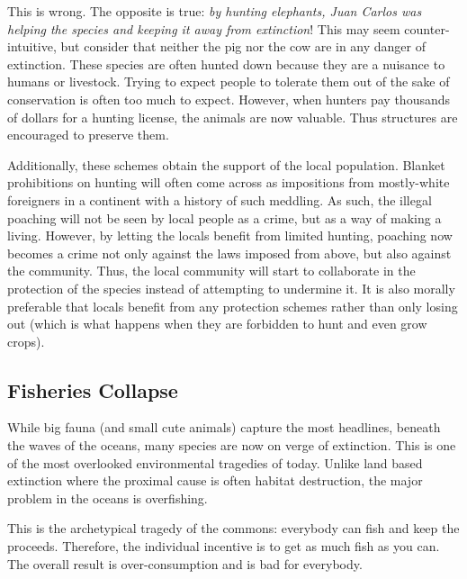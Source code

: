 This is wrong. The opposite is true: \emph{by hunting elephants, Juan Carlos
was helping the species and keeping it away from extinction}! This may seem
counter-intuitive, but consider that neither the pig nor the cow are in any
danger of extinction. These species are often hunted down because they are a
nuisance to humans or livestock. Trying to expect people to tolerate them out
of the sake of conservation is often too much to expect. However, when hunters
pay thousands of dollars for a hunting license, the animals are now valuable.
Thus structures are encouraged to preserve them.

Additionally, these schemes obtain the support of the local population. Blanket
prohibitions on hunting will often come across as impositions from mostly-white
foreigners in a continent with a history of such meddling. As such, the illegal
poaching will not be seen by local people as a crime, but as a way of making a
living. However, by letting the locals benefit from limited hunting, poaching
now becomes a crime not only against the laws imposed from above, but also
against the community. Thus, the local community will start to collaborate in
the protection of the species instead of attempting to undermine it. It is also
morally preferable that locals benefit from any protection schemes rather than
only losing out (which is what happens when they are forbidden to hunt and even
grow crops).


\subsection{Fisheries Collapse}

While big fauna (and small cute animals) capture the most headlines, beneath
the waves of the oceans, many species are now on verge of extinction. This is
one of the most overlooked environmental tragedies of today. Unlike land based
extinction where the proximal cause is often habitat destruction, the major
problem in the oceans is overfishing.

This is the archetypical tragedy of the commons: everybody can fish and keep
the proceeds. Therefore, the individual incentive is to get as much fish as you
can. The overall result is over-consumption and is bad for everybody.

